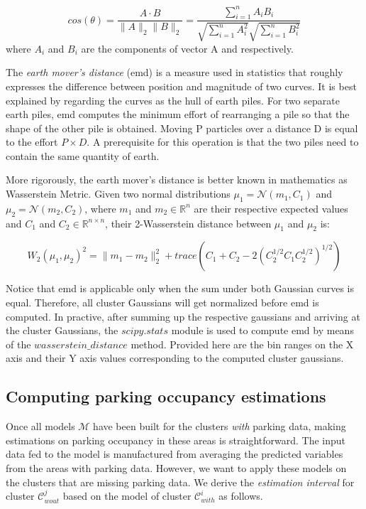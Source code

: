 	\begin{equation}
	cos(\theta)=\frac{A\cdot B}{{\lVert}A{\rVert}       
		_2{\lVert}B{\rVert}_2}=\frac{\sum_{i=1}^n{A_iB_i}}{\sqrt{\sum_{i=1}^n{A_i^2}}\sqrt{\sum_{i=1}^n{B_i^2}}}
	\end{equation}
	where $A_i$ and $B_i$ are the components of vector A and respectively. 
	
	The \textit{earth mover's distance} (emd) is a measure used in statistics that roughly expresses the difference between position and magnitude of two curves. It is best explained by regarding the curves as the hull of earth piles. For two separate earth piles, emd computes the minimum effort of rearranging a pile so that the shape of the other pile is obtained. Moving P particles over a distance D is equal to the effort $P \times D$. A prerequisite for this operation is that the two piles need to contain the same quantity of earth.
	
	More rigorously, the earth mover's distance is better known in mathematics as Wasserstein Metric. Given two normal distributions $\mu_1=\mathcal{N}(m_1,C_1)$ and $\mu_2=\mathcal{N}(m_2,C_2)$, where $m_1$ and $m_2 \in \mathbb{R}^{n}$ are their respective expected values and $C_1$ and $C_2 \in \mathbb{R}^{n\times n}$, their 2-Wasserstein distance between $\mu_1$ and $\mu_2$ is:
	
	\begin{equation}
	W_2(\mu_1,\mu_2)^2={\lVert}m_1-m_2{\rVert}^2_2+trace(C_1+C_2-2(C_2^{1/2}C_1C_2^{1/2})^{1/2})
	\end{equation}
	
	Notice that emd is applicable only when the sum under both Gaussian curves is equal. Therefore, all cluster Gaussians will get normalized before emd is computed. In practive, after summing up the respective gaussians and arriving at the cluster Gaussians, the $scipy.stats$ module is used to compute emd by means of the $wasserstein\_distance$ method. Provided here are the bin ranges on the X axis and their Y axis values corresponding to the computed cluster gaussians.
	
	\subsection{Computing parking occupancy estimations}
	Once all models $\mathcal{M}$ have been built for the clusters \textit{with} parking data, making estimations on parking occupancy in these areas is straightforward. The input data fed to the model is manufactured from averaging the predicted variables from the areas with parking data. However, we want to apply these models on the clusters that are missing parking data. We derive the \textit{estimation interval} for cluster $\mathcal{C}_{wout}^j$ based on the model of cluster $\mathcal{C}_{with}^i$ as follows.
	
